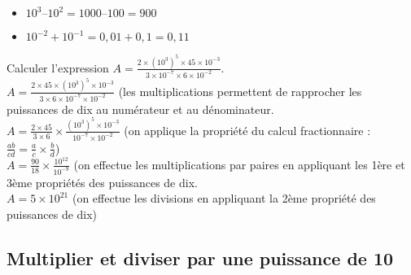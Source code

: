 \documentclass[10pt]{article}
\begin{document}
{\begin{Ex}
\begin{itemize}
\item	$10^3–10^2 = 1 000–100= 900$	
\item $10^{-2}+10^{-1} = 0,01+0,1= 0,11$
\end{itemize}
\end{Ex}
	   
\begin{Ex}	Calculer l'expression $A =\frac{2\times \left(10^3\right)^5\times 45 \times 10^{-3}}{3\times 10^{-7}\times 6\times 10^{-2}} $.	   
\\$A=\frac{2\times 45 \times \left(10^3\right)^5 \times 10^{-3}}{3\times 6\times 10^{-7}\times  10^{-2}} $ 	(les multiplications permettent de \og rapprocher \fg{}
les puissances de dix au numérateur et au dénominateur. 	   
\\$A =\frac{2\times 45}{3\times 6}\times \frac{\left(10^3\right)^5 \times 10^{-3}}{10^{-7}\times  10^{-2}} $ 	(on applique la propriété du calcul fractionnaire : $\frac{ab}{cd}=\frac{a}{c}\times \frac{b}{d}$)	\\$A =\frac{90}{18}\times \frac{10^{12}}{10^{-9}}$ 	(on effectue les multiplications par paires en appliquant
les 1ère et 3ème propriétés des puissances de dix.	   
\\$A =5\times 10^{21}$ 	(on effectue les divisions en appliquant
la 2ème propriété des puissances de dix)
\end{Ex}

\subsection{Multiplier et diviser par une puissance de 10}





 
	



}
\end{document}
